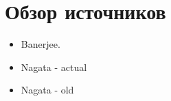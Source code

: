 \section{ Обзор источников }\label{sec:litreview}

\begin{itemize}
	\item Banerjee. 

	\item Nagata - actual

	\item Nagata - old
\end{itemize}
